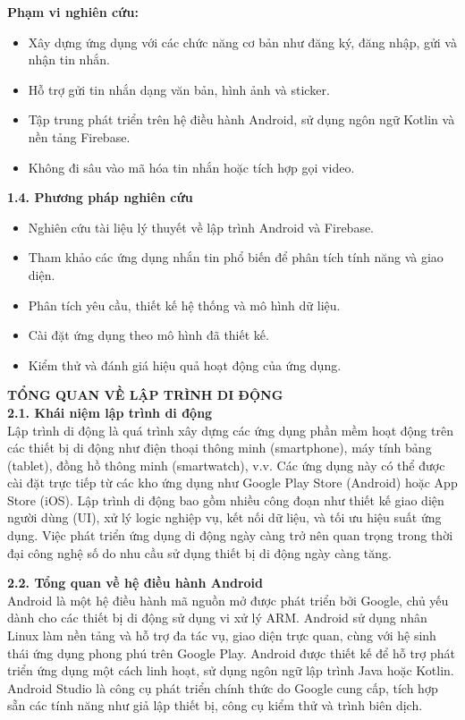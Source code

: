 \documentclass[12pt,a4paper]{article}
\begin{document}
	\noindent\textbf{Phạm vi nghiên cứu:}
	\begin{itemize}
		\item Xây dựng ứng dụng với các chức năng cơ bản như đăng ký, đăng nhập, gửi và nhận tin nhắn.
		\item Hỗ trợ gửi tin nhắn dạng văn bản, hình ảnh và sticker.
		\item Tập trung phát triển trên hệ điều hành Android, sử dụng ngôn ngữ Kotlin và nền tảng Firebase.
		\item Không đi sâu vào mã hóa tin nhắn hoặc tích hợp gọi video.
	\end{itemize}
	
	\vspace{0.5cm}
	
	\noindent\textbf{1.4. Phương pháp nghiên cứu}
	
	\begin{itemize}
		\item Nghiên cứu tài liệu lý thuyết về lập trình Android và Firebase.
		\item Tham khảo các ứng dụng nhắn tin phổ biến để phân tích tính năng và giao diện.
		\item Phân tích yêu cầu, thiết kế hệ thống và mô hình dữ liệu.
		\item Cài đặt ứng dụng theo mô hình đã thiết kế.
		\item Kiểm thử và đánh giá hiệu quả hoạt động của ứng dụng.
	\end{itemize}
	\vspace{0.5cm}
	\textbf{TỔNG QUAN VỀ LẬP TRÌNH DI ĐỘNG} \\
	
	\textbf{2.1. Khái niệm lập trình di động} \\
	Lập trình di động là quá trình xây dựng các ứng dụng phần mềm hoạt động trên các thiết bị di động như điện thoại thông minh (smartphone), máy tính bảng (tablet), đồng hồ thông minh (smartwatch), v.v. Các ứng dụng này có thể được cài đặt trực tiếp từ các kho ứng dụng như Google Play Store (Android) hoặc App Store (iOS). Lập trình di động bao gồm nhiều công đoạn như thiết kế giao diện người dùng (UI), xử lý logic nghiệp vụ, kết nối dữ liệu, và tối ưu hiệu suất ứng dụng. Việc phát triển ứng dụng di động ngày càng trở nên quan trọng trong thời đại công nghệ số do nhu cầu sử dụng thiết bị di động ngày càng tăng.
	
	\textbf{2.2. Tổng quan về hệ điều hành Android} \\
	Android là một hệ điều hành mã nguồn mở được phát triển bởi Google, chủ yếu dành cho các thiết bị di động sử dụng vi xử lý ARM. Android sử dụng nhân Linux làm nền tảng và hỗ trợ đa tác vụ, giao diện trực quan, cùng với hệ sinh thái ứng dụng phong phú trên Google Play. Android được thiết kế để hỗ trợ phát triển ứng dụng một cách linh hoạt, sử dụng ngôn ngữ lập trình Java hoặc Kotlin. Android Studio là công cụ phát triển chính thức do Google cung cấp, tích hợp sẵn các tính năng như giả lập thiết bị, công cụ kiểm thử và trình biên dịch.
	
\end{document}
